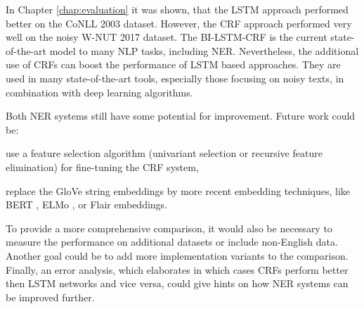\documentclass[12pt]{book}
\begin{document}
	In Chapter \ref{chap:evaluation} it was shown, that the LSTM approach performed better on the CoNLL 2003 dataset. However, the CRF approach performed very well on the noisy W-NUT 2017 dataset. The BI-LSTM-CRF is the current state-of-the-art model to many NLP tasks, including NER. Nevertheless, the additional use of CRFs can boost the performance of LSTM based approaches. They are used in many state-of-the-art tools, especially those focusing on noisy texts, in combination with deep learning algorithms.
	
	Both NER systems still have some potential for improvement. Future work could be:
	\begin{enumerate*}
		\item use a feature selection algorithm (univariant selection or recursive feature elimination) for fine-tuning the CRF system,
		\item replace the GloVe string embeddings by more recent embedding techniques, like BERT \cite{devlin2018bert}, ELMo \cite{peters2018deep}, or Flair \cite{akbik2018contextual} embeddings.
	\end{enumerate*}

	To provide a more comprehensive comparison, it would also be necessary to measure the performance on additional datasets or include non-English data. Another goal could be to add more implementation variants to the comparison. Finally, an error analysis, which elaborates in which cases CRFs perform better then LSTM networks and vice versa, could give hints on how NER systems can be improved further.
	
	
	
\end{document}
